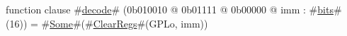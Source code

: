 function clause #\hyperref[sailMIPSzdecode]{decode}# (0b010010 @ 0b01111 @ 0b00000 @ imm : #\hyperref[sailMIPSzbits]{bits}#(16)) = #\hyperref[sailMIPSzSome]{Some}#(#\hyperref[sailMIPSzClearRegs]{ClearRegs}#(GPLo, imm))
